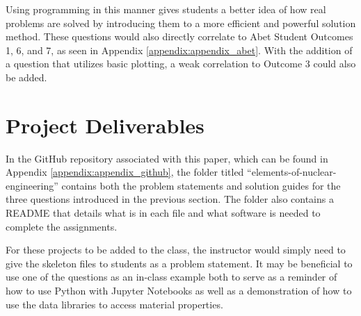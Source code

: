 Using programming in this manner gives students a better idea of how real problems are solved by
introducing them to a more efficient and powerful solution method. These questions would also 
directly correlate to Abet Student Outcomes 1, 6, and 7, as seen in Appendix 
\ref{appendix:appendix_abet}. With the addition of a question that utilizes basic plotting, a 
weak correlation to Outcome 3 could also be added.

\section{Project Deliverables}

In the GitHub repository associated with this paper, which can be found in 
Appendix \ref{appendix:appendix_github}, the folder titled ``elements-of-nuclear-engineering''
contains both the problem statements and solution guides for the three questions introduced in 
the previous section. The folder also contains a README that details what is in each file and 
what software is needed to complete the assignments. 

For these projects to be added to the class, the instructor would simply need to give the 
skeleton files to students as a problem statement. It may be beneficial to use one of the questions 
as an in-class example both to serve as a reminder of how to use Python with Jupyter Notebooks 
as well as a demonstration of how to use the data libraries to access material properties.